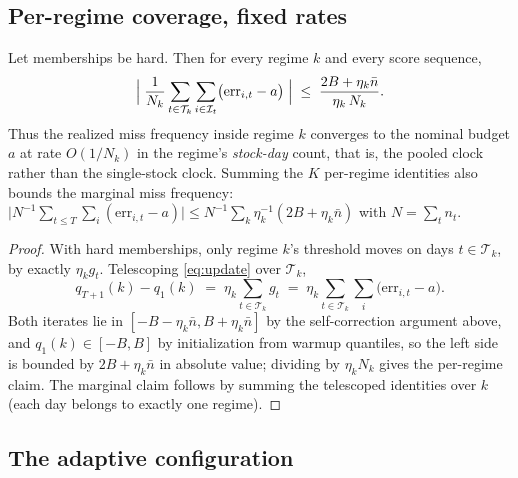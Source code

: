 \subsection{Per-regime coverage, fixed rates}\label{sec:hard-theory}

\begin{proposition}\label{prop:hard}
Let memberships be hard. Then for every regime $k$ and every score
sequence,
\[
  \Bigl|\; \frac{1}{N_k} \sum_{t \in \mathcal{T}_k} \sum_{i \in \mathcal{I}_t}
     \bigl( \mathrm{err}_{i,t} - a \bigr) \;\Bigr|
  \;\le\; \frac{ 2B + \eta_k \bar n }{ \eta_k \, N_k }.
\]
Thus the realized miss frequency inside regime $k$ converges to the nominal
budget $a$ at rate $O(1/N_k)$ in the regime's \emph{stock-day} count, that
is, the pooled clock rather than the single-stock clock. Summing the $K$
per-regime identities also bounds the marginal miss frequency:
$\bigl| N^{-1} \sum_{t \le T} \sum_i (\mathrm{err}_{i,t} - a) \bigr| \le
N^{-1} \sum_k \eta_k^{-1} (2B + \eta_k \bar n)$ with $N = \sum_t n_t$.
\end{proposition}

\begin{proof}
With hard memberships, only regime $k$'s threshold moves on days
$t \in \mathcal{T}_k$, by exactly $\eta_k g_t$. Telescoping
\eqref{eq:update} over $\mathcal{T}_k$,
\[
  q_{T+1}(k) - q_{1}(k) \;=\; \eta_k \sum_{t \in \mathcal{T}_k} g_t
  \;=\; \eta_k \sum_{t \in \mathcal{T}_k} \sum_{i}
        \bigl( \mathrm{err}_{i,t} - a \bigr).
\]
Both iterates lie in $[-B - \eta_k \bar n, B + \eta_k \bar n]$ by the
self-correction argument above, and $q_1(k) \in [-B, B]$ by initialization
from warmup quantiles, so the left side is bounded by
$2B + \eta_k \bar n$ in absolute value; dividing by $\eta_k N_k$ gives the
per-regime claim. The marginal claim follows by summing the telescoped
identities over $k$ (each day belongs to exactly one regime).
\end{proof}

\subsection{The adaptive configuration}\label{sec:adaptive-theory}

